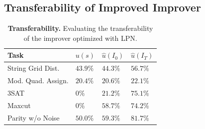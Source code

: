 \documentclass{article}
\newcommand{\metautil}{{\hat{u}}}
\newcommand{\sol}{{s}}
\begin{document}
\vspace{15px}
\null

\vspace{-20px}
\subsection{Transferability of Improved Improver}






















\begin{table}

\vspace{-5px}
\caption{\textbf{Transferability.} Evaluating the transferability of the improver optimized with LPN.\vspace{-6px}}
\label{tbl:transfer}
\begin{tabular}{llll}
\toprule
Task                    & $u(\sol)$ & $\metautil(I_0)$ & $\metautil(I_T)$ \\
\midrule
String Grid Dist.           & $43.9\%$          & $44.3\%$      &   $56.7\%$   \\
Mod. Quad. Assign.          & $20.4\% $         & $20.6\%$      &   $22.1\%$       \\
3SAT                        & $0\%$            & $21.2\%$      &   $75.1\%$      \\
Maxcut                      & $0\%$              & $58.7\%$      &   $74.2\%$      \\
Parity w/o Noise            & $50.0\%$            & $59.3\%$      &   $81.7\%$       \\

\bottomrule
\end{tabular}
\vspace{-5pt}
\end{table}
\end{document}
